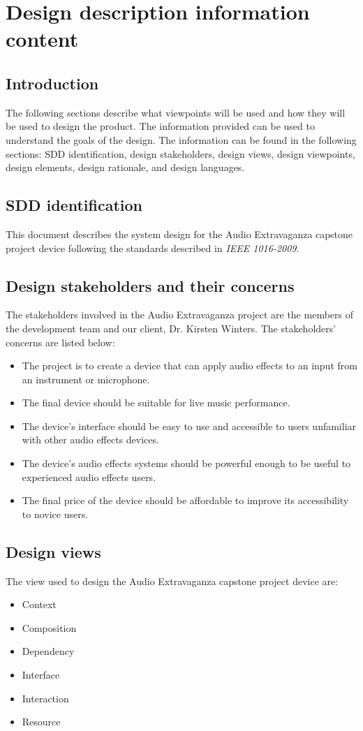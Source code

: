\section{Design description information content}

\subsection{Introduction}
    The following sections describe what viewpoints will be used and how they will be used to design the product. The information provided can be used to understand the goals of the design. The information can be found in the following sections: SDD identification, design stakeholders, design views, design viewpoints, design elements, design rationale, and design languages.

\subsection{SDD identification}
    This document describes the system design for the Audio Extravaganza capstone project device following the standards described in \textit{IEEE 1016-2009}.
    
\subsection{Design stakeholders and their concerns}
    The stakeholders involved in the Audio Extravaganza project are the members of the development team and our client, Dr. Kirsten Winters. The stakeholders' concerns are listed below:
    \begin{itemize}
        \item The project is to create a device that can apply audio effects to an input from an instrument or microphone.
        \item The final device should be suitable for live music performance.
        \item The device's interface should be easy to use and accessible to users unfamiliar with other audio effects devices.
        \item The device's audio effects systems should be powerful enough to be useful to experienced audio effects users.
        \item The final price of the device should be affordable to improve its accessibility to novice users.
    \end{itemize}
\subsection{Design views}
    The view used to design the Audio Extravaganza capstone project device are:
    \begin{itemize}
        \item Context
        \item Composition
        \item Dependency
        \item Interface
        \item Interaction
        \item Resource
    \end{itemize}

